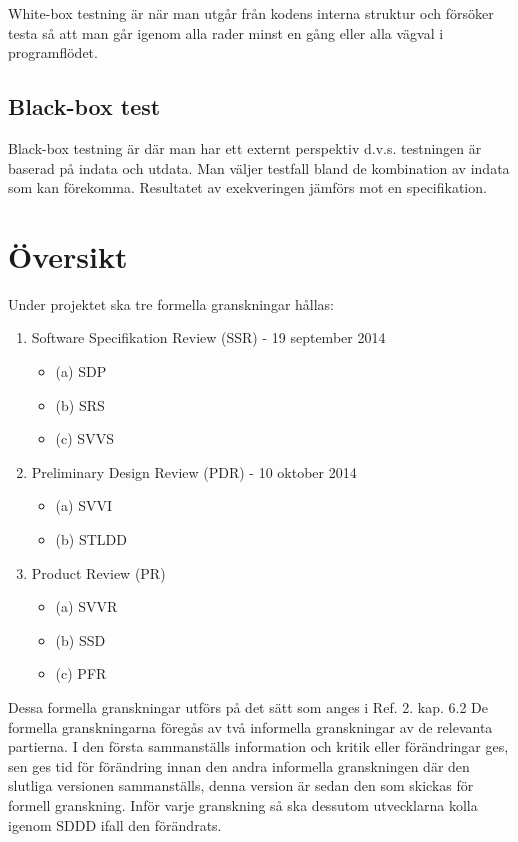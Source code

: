 \documentclass[a4paper]{article}
\begin{document}
White-box testning är när man utgår från kodens interna struktur och försöker testa så att man går igenom alla rader minst en gång eller alla vägval i programflödet.

\subsection{Black-box test}

Black-box testning är där man har ett externt perspektiv d.v.s. testningen är baserad på indata och utdata. Man väljer testfall bland de kombination av indata som kan förekomma. Resultatet av exekveringen jämförs mot en specifikation.


\section{Översikt}

Under projektet ska tre formella granskningar hållas:

\begin{enumerate}


\item Software Specifikation Review (SSR) - 19 september 2014
\begin{itemize}
\item [](a) SDP
\item [](b) SRS
\item [](c) SVVS
\end{itemize}


\item Preliminary Design Review (PDR) - 10 oktober 2014
\begin{itemize}
\item [](a) SVVI
\item [](b) STLDD
\end{itemize}


\item Product Review (PR)
\begin{itemize}
\item [](a) SVVR
\item [](b) SSD
\item [](c) PFR
\end{itemize}


\end{enumerate}

Dessa formella granskningar utförs på det sätt som anges i Ref. 2. kap. 6.2 De formella granskningarna föregås av två informella granskningar av de relevanta partierna. I den första sammanställs information och kritik eller förändringar ges, sen ges tid för förändring innan den andra informella granskningen där den slutliga versionen sammanställs, denna version är sedan den som skickas för formell granskning. Inför varje granskning så ska dessutom utvecklarna kolla igenom SDDD ifall den förändrats.
\end{document}
